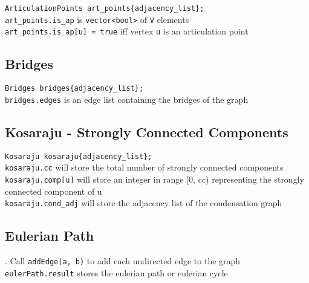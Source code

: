 \verb|ArticulationPoints art_points{adjacency_list};| \\
\verb|art_points.is_ap| is \verb|vector<bool>| of \verb|V| elements \\
\verb|art_points.is_ap[u] = true| iff vertex \verb|u| is an articulation point


\subsection{Bridges}

\verb|Bridges bridges{adjacency_list};| \\
\verb|bridges.edges| is an edge list containing the bridges of the graph


\subsection{Kosaraju - Strongly Connected Components}

\verb|Kosaraju kosaraju{adjacency_list};| \\
\verb|kosaraju.cc| will store the total number of strongly connected components \\
\verb|kosaraju.comp[u]| will store an integer in range [0, cc) representing the strongly connected component of u \\
\verb|kosaraju.cond_adj| will store the adjacency list of the condensation graph

\subsection{Eulerian Path}
. 
Call \verb|addEdge(a, b)| to add each undirected edge to the graph \\
\verb|eulerPath.result| stores the eulerian path or eulerian cycle

